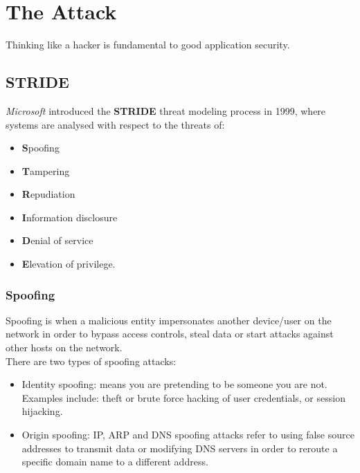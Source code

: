 \documentclass[a5paper,pagesize,10pt,bibtotoc,DIV=10,twoside]{scrbook}
\begin{document}
\chapter{The Attack}
Thinking like a hacker is fundamental to good application security.

\section{STRIDE}

\textit{Microsoft} introduced the \textbf{STRIDE} threat modeling process in 1999, where systems are analysed with respect to the threats of: \\

\begin{itemize}
\item \textbf{S}poofing
\item \textbf{T}ampering
\item \textbf{R}epudiation 
\item \textbf{I}nformation disclosure 
\item \textbf{D}enial of service 
\item \textbf{E}levation of privilege.
\end{itemize}

\subsection{Spoofing}

Spoofing is when a malicious entity impersonates another device/user on the network in order to bypass access controls, steal data or start attacks against other hosts on the network.\\

There are two types of spoofing attacks:

\begin{itemize}
\item Identity spoofing: means you are pretending to be someone you are not. Examples include: theft or brute force hacking of user credentials, or session hijacking.
\item Origin spoofing: IP, ARP and DNS spoofing attacks refer to using false source addresses to transmit data or modifying DNS servers in order to reroute a specific domain name to a different address. 
\end{itemize}
\end{document}
